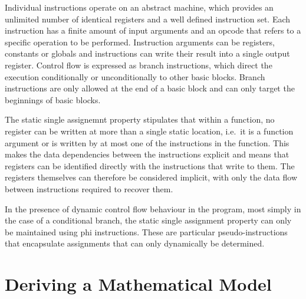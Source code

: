     Individual instructions operate on an abstract machine, which provides an
    unlimited number of identical registers and a well defined instruction set.
    Each instruction has a finite amount of input arguments and an opcode that
    refers to a specific operation to be performed.
    Instruction arguments can be registers, constants or globals and
    instructions can write their result into a single output register.
    Control flow is expressed as branch instructions, which direct the execution
    conditionally or unconditionally to other basic blocks.
    Branch instructions are only allowed at the end of a basic block and can
    only target the beginnings of basic blocks.

    The static single assignemnt property stipulates that within a function,
    no register can be written at more than a single static location, i.e.\ it
    is a function argument or is written by at most one of the instructions in
    the function.
    This makes the data dependencies between the instructions explicit and
    means that registers can be identified directly with the instructions that
    write to them.
    The registers themselves can therefore be considered implicit, with only the
    data flow between instructions required to recover them.

    In the presence of dynamic control flow behaviour in the program, most
    simply in the case of a conditional branch, the static single assignment
    property can only be maintained using phi instructions.
    These are particular pseudo-instructions that encapsulate assignments that
    can only dynamically be determined.

\section{Deriving a Mathematical Model}

